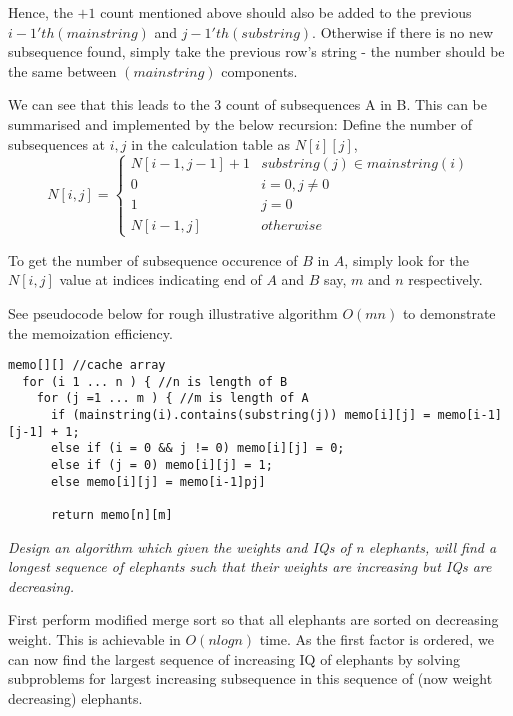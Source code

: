 \documentclass[11pt, a4paper]{article}
\begin{document}
 Hence, the $+1$ count mentioned above should also be added to the previous $i-1'th (main string)$ and $j-1'th (substring)$. Otherwise if there is no new subsequence found, simply take the previous row's string - the number should be the same between $(main string)$ components.
 
 We can see that this leads to the 3 count of subsequences A in B.
This can be summarised and implemented by the below recursion:
Define the number of subsequences at $i, j$ in the calculation table as $N[i][j]$,
\[ N[i, j] = \begin{cases}
  N[i-1, j-1] + 1  &  substring(j) \in mainstring(i)\\
        0 & i = 0, j \ne 0 \\
        1 & j = 0 \\
        N[i-1, j] & otherwise
        \end{cases}
\]
 
To get the number of subsequence occurence of $B$ in $A$, simply look for the $N[i,j]$ value at indices indicating end of $A$ and $B$ say, $m$ and $n$ respectively.

See pseudocode below for rough illustrative algorithm $O(mn)$ to demonstrate the memoization efficiency. 

\vspace{20mm}

\begin{lstlisting}[frame=single]
  memo[][] //cache array
  for (i 1 ... n ) { //n is length of B
    for (j =1 ... m ) { //m is length of A
      if (mainstring(i).contains(substring(j)) memo[i][j] = memo[i-1][j-1] + 1;
      else if (i = 0 && j != 0) memo[i][j] = 0;
      else if (j = 0) memo[i][j] = 1;
      else memo[i][j] = memo[i-1]pj]
 
      return memo[n][m]
\end{lstlisting}


\textit{Design an algorithm which given the weights and IQs of n elephants, will find a longest sequence of elephants such that their weights are increasing but IQs are decreasing.}

\vspace{2mm}
First perform modified merge sort so that all elephants are sorted on decreasing weight.
This is achievable in $O(nlog n)$ time.
As the first factor is ordered, we can now find the largest sequence of increasing IQ of elephants by solving subproblems for largest increasing subsequence in this sequence of (now weight decreasing) elephants.
\end{document}
